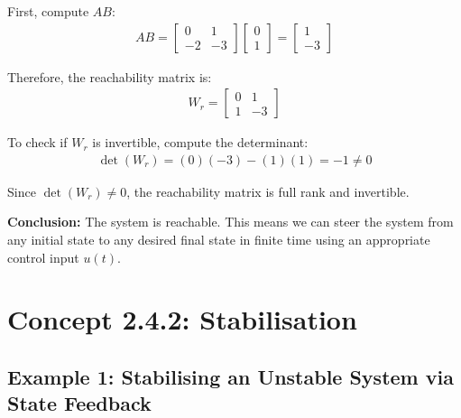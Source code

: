\documentclass[11pt,a4paper]{article}
\begin{document}
First, compute $AB$:
\begin{align}
AB = \begin{bmatrix} 0 & 1 \\ -2 & -3 \end{bmatrix}\begin{bmatrix} 0 \\ 1 \end{bmatrix} = \begin{bmatrix} 1 \\ -3 \end{bmatrix}
\end{align}

Therefore, the reachability matrix is:
\begin{align}
W_r = \begin{bmatrix} 0 & 1 \\ 1 & -3 \end{bmatrix}
\end{align}

To check if $W_r$ is invertible, compute the determinant:
\begin{align}
\det(W_r) = (0)(-3) - (1)(1) = -1 \neq 0
\end{align}

Since $\det(W_r) \neq 0$, the reachability matrix is full rank and invertible.

\textbf{Conclusion:} The system is reachable. This means we can steer the system from any initial state to any desired final state in finite time using an appropriate control input $u(t)$.

\section{Concept 2.4.2: Stabilisation}

\subsection{Example 1: Stabilising an Unstable System via State Feedback}
\end{document}
